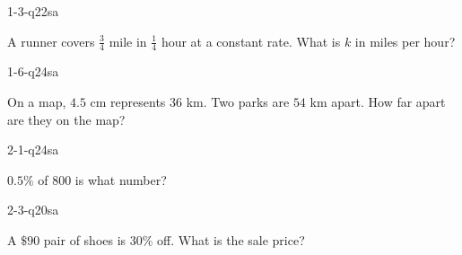 \documentclass[12pt, fleqn, openany]{studyGuide}
\begin{document}
\renewcommand{\VMBookTitle}{3 Texas STAAR Grade 7 Math Practice Tests}
\renewcommand{\VMBookSubtitle}{Full-Length Test Prep with Detailed Answer Explanations}
\renewcommand{\VMFooterURL}{https://viewmath.com/grade7}
\renewcommand{\VMFooterURLDisplay}{ViewMath.com/Grade7}






\tableofcontents
\cleardoublepage
{}


\begin{practiceQuestion}{1-3-q22}{sa}
\begin{questionText}
A runner covers $\frac{3}{4}$ mile in $\frac{1}{4}$ hour at a constant rate. What is $k$ in miles per hour?
\end{questionText}
\end{practiceQuestion}

\begin{practiceQuestion}{1-6-q24}{sa}
\begin{questionText}
On a map, $4.5$ cm represents $36$ km. Two parks are $54$ km apart. How far apart are they on the map?
\end{questionText}
\end{practiceQuestion}

\begin{practiceQuestion}{2-1-q24}{sa}
\begin{questionText}
$0.5\%$ of $800$ is what number?
\end{questionText}
\end{practiceQuestion}

\begin{practiceQuestion}{2-3-q20}{sa}
\begin{questionText}
A $\$90$ pair of shoes is $30\%$ off. What is the sale price?
\end{questionText}
\end{practiceQuestion}
\end{document}
